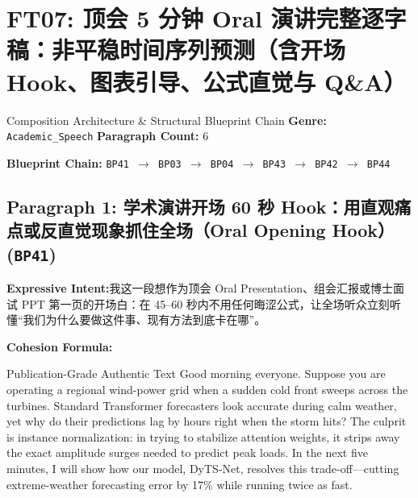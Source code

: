 \section{FT07: 顶会 5 分钟 Oral 演讲完整逐字稿：非平稳时间序列预测（含开场 Hook、图表引导、公式直觉与 Q\&A）}\label{comp:FT07}
\begin{ConceptBox}{Composition Architecture \& Structural Blueprint Chain}
\textbf{Genre:} \texttt{Academic\_Speech} \quad \textbf{Paragraph Count:} 6\par
\textbf{Blueprint Chain:} \texttt{BP41 $\to$ BP03 $\to$ BP04 $\to$ BP43 $\to$ BP42 $\to$ BP44}
\end{ConceptBox}
\subsection*{Paragraph 1: 学术演讲开场 60 秒 Hook：用直观痛点或反直觉现象抓住全场（Oral Opening Hook） (\texttt{BP41})}
\noindent\textbf{Expressive Intent:}\enspace 我这一段想作为顶会 Oral Presentation、组会汇报或博士面试 PPT 第一页的开场白：在 45--60 秒内不用任何晦涩公式，让全场听众立刻听懂“我们为什么要做这件事、现有方法到底卡在哪”。\par
\noindent\textbf{Cohesion Formula:}\par\vspace{4pt}
\begin{ExampleBox}{Publication-Grade Authentic Text}
Good morning everyone. Suppose you are operating a regional wind-power grid when a sudden cold front sweeps across the turbines. Standard Transformer forecasters look accurate during calm weather, yet why do their predictions lag by hours right when the storm hits? The culprit is instance normalization: in trying to stabilize attention weights, it strips away the exact amplitude surges needed to predict peak loads. In the next five minutes, I will show how our model, DyTS-Net, resolves this trade-off---cutting extreme-weather forecasting error by 17\% while running twice as fast.
\end{ExampleBox}
